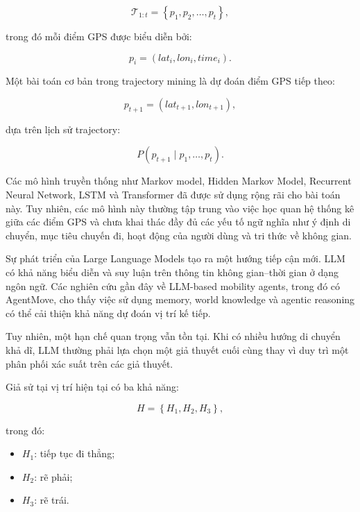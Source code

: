 \documentclass[11pt,a4paper]{article}
\begin{document}
	\begin{equation}
		\mathcal{T}_{1:t}
		=
		\left\{
		p_1,p_2,\ldots,p_t
		\right\},
	\end{equation}
	
	trong đó mỗi điểm GPS được biểu diễn bởi:
	
	\begin{equation}
		p_i =
		(lat_i,lon_i,time_i).
	\end{equation}
	
	Một bài toán cơ bản trong trajectory mining là dự đoán điểm GPS tiếp theo:
	
	\begin{equation}
		p_{t+1}
		=
		(lat_{t+1},lon_{t+1}),
	\end{equation}
	
	dựa trên lịch sử trajectory:
	
	\begin{equation}
		P
		\left(
		p_{t+1}
		\mid
		p_1,\ldots,p_t
		\right).
	\end{equation}
	
	Các mô hình truyền thống như Markov model, Hidden Markov Model,
	Recurrent Neural Network, LSTM và Transformer đã được sử dụng rộng rãi
	cho bài toán này. Tuy nhiên, các mô hình này thường tập trung vào việc
	học quan hệ thống kê giữa các điểm GPS và chưa khai thác đầy đủ các yếu
	tố ngữ nghĩa như ý định di chuyển, mục tiêu chuyến đi, hoạt động của
	người dùng và tri thức về không gian.
	
	Sự phát triển của Large Language Models tạo ra một hướng tiếp cận mới.
	LLM có khả năng biểu diễn và suy luận trên thông tin không gian--thời
	gian ở dạng ngôn ngữ. Các nghiên cứu gần đây về LLM-based mobility agents,
	trong đó có AgentMove, cho thấy việc sử dụng memory, world knowledge và
	agentic reasoning có thể cải thiện khả năng dự đoán vị trí kế tiếp.
	
	Tuy nhiên, một hạn chế quan trọng vẫn tồn tại. Khi có nhiều hướng di
	chuyển khả dĩ, LLM thường phải lựa chọn một giả thuyết cuối cùng thay vì
	duy trì một phân phối xác suất trên các giả thuyết.
	
	Giả sử tại vị trí hiện tại có ba khả năng:
	
	\begin{equation}
		H =
		\left\{
		H_1,H_2,H_3
		\right\},
	\end{equation}
	
	trong đó:
	
	\begin{itemize}
		\item $H_1$: tiếp tục đi thẳng;
		\item $H_2$: rẽ phải;
		\item $H_3$: rẽ trái.
	\end{itemize}
	
\end{document}
